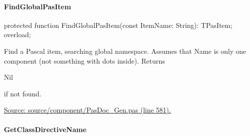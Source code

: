 \documentclass{report}
\newif\ifpdf
\begin{document}
\paragraph*{FindGlobalPasItem}\hspace*{\fill}

\label{PasDoc_Gen.TDocGenerator-FindGlobalPasItem}
\begin{list}{}{
\setlength{\itemindent}{0cm}
\setlength{\listparindent}{0cm}
\setlength{\leftmargin}{\evensidemargin}
\addtolength{\leftmargin}{\tmplength}
\settowidth{\labelsep}{X}
\addtolength{\leftmargin}{\labelsep}
\setlength{\labelwidth}{\tmplength}
}
\item[\textbf{Declaration}\hfill]
\ifpdf
\begin{flushleft}
\fi
\begin{ttfamily}
protected function FindGlobalPasItem(const ItemName: String): TPasItem; overload;\end{ttfamily}

\ifpdf
\end{flushleft}
\fi

\par
\item[\textbf{Description}]
Find a Pascal item, searching global namespace. Assumes that Name is only one component (not something with dots inside). Returns \begin{ttfamily}Nil\end{ttfamily} if not found.\par
\href{https://github.com/pasdoc/pasdoc/blob/master/source/component/PasDoc_Gen.pas#L581}{Source: source/component/PasDoc{\_}Gen.pas (line 581).}

\end{list}
\paragraph*{GetClassDirectiveName}\hspace*{\fill}
\end{document}

